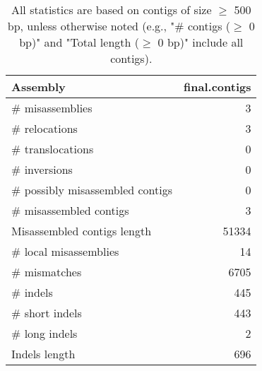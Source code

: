 \documentclass[12pt,a4paper]{article}
\begin{document}
\begin{table}[ht]
\begin{center}
\caption{All statistics are based on contigs of size $\geq$ 500 bp, unless otherwise noted (e.g., "\# contigs ($\geq$ 0 bp)" and "Total length ($\geq$ 0 bp)" include all contigs).}
\begin{tabular}{|l*{1}{|r}|}
\hline
Assembly & final.contigs \\ \hline
\# misassemblies & 3 \\ \hline
\hspace{5mm}\# relocations & 3 \\ \hline
\hspace{5mm}\# translocations & 0 \\ \hline
\hspace{5mm}\# inversions & 0 \\ \hline
\# possibly misassembled contigs & 0 \\ \hline
\# misassembled contigs & 3 \\ \hline
Misassembled contigs length & 51334 \\ \hline
\# local misassemblies & 14 \\ \hline
\# mismatches & 6705 \\ \hline
\# indels & 445 \\ \hline
\hspace{5mm}\# short indels & 443 \\ \hline
\hspace{5mm}\# long indels & 2 \\ \hline
Indels length & 696 \\ \hline
\end{tabular}
\end{center}
\end{table}
\end{document}
